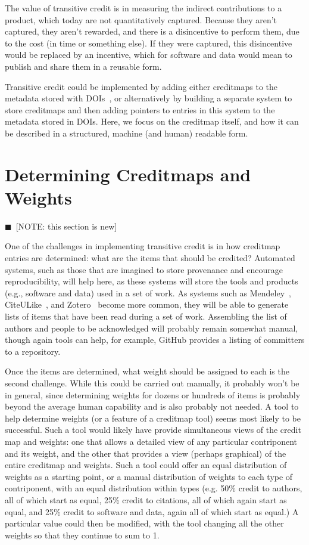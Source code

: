 \documentclass[a4paper,10pt]{article}
\newcommand{\note}[1]{{\color{darkgreen}$\blacksquare$~\textsf{[NOTE: #1]}}}
\begin{document}
The value of transitive credit is in measuring the indirect contributions to a product, which today are not quantitatively captured. Because they aren't captured, they aren't rewarded, and there is a disincentive to perform them, due to the cost (in time or something else). If they were captured, this disincentive would be replaced by an incentive, which for software and data would mean to publish and share them in a reusable form.

Transitive credit could be implemented by adding either creditmaps to the metadata stored with DOIs~\cite{DOI-data-model}, or alternatively by building a separate system to store creditmaps and then adding pointers to entries in this system to the metadata stored in DOIs. Here, we focus on the creditmap itself, and how it can be described in a structured, machine (and human) readable form.

\section{Determining Creditmaps and Weights}

\note{this section is new}

One of the challenges in implementing transitive credit is in how creditmap entries are determined: what are the items that should be credited? Automated systems, such as those that are imagined to store provenance and encourage reproducibility, will help here, as these systems will store the tools and products (e.g., software and data) used in a set of work. As systems such as Mendeley~\cite{mendeley}, CiteULike~\cite{citeulike}, and Zotero~\cite{zotero} become more common, they will be able to generate lists of items that have been read during a set of work. Assembling the list of authors and people to be acknowledged will probably remain somewhat manual, though again tools can help, for example, GitHub provides a listing of committers to a repository.

Once the items are determined, what weight should be assigned to each is the second challenge. While this could be carried out manually, it probably won't be in general, since determining weights for dozens or hundreds of items is probably beyond the average human capability and is also probably not needed. A tool to help determine weights (or a feature of a creditmap tool) seems most likely to be successful. Such a tool would likely have provide simultaneous views of the credit map and weights: one that allows a detailed view of any particular contriponent and its weight, and the other that provides a view (perhaps graphical) of the entire creditmap and weights. Such a tool could offer an equal distribution of weights as a starting point, or a manual distribution of weights to each type of contriponent, with an equal distribution within types (e.g. 50\% credit to authors, all of which start as equal, 25\% credit to citations, all of which again start as equal, and 25\% credit to software and data, again all of which start as equal.) A particular value could then be modified, with the tool changing all the other weights so that they continue to sum to 1.
\end{document}
